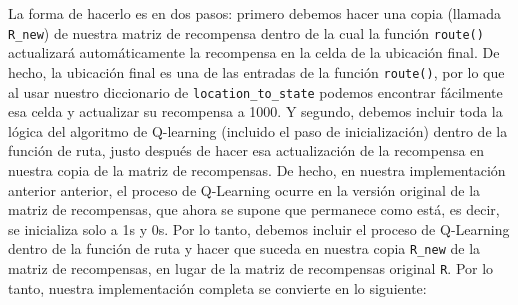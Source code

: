 \documentclass[
]{book}
\begin{document}
La forma de hacerlo es en dos pasos: primero debemos hacer una copia (llamada \texttt{R\_new}) de nuestra matriz de recompensa dentro de la cual la función \texttt{route()} actualizará automáticamente la recompensa en la celda de la ubicación final. De hecho, la ubicación final es una de las entradas de la función \texttt{route()}, por lo que al usar nuestro diccionario de \texttt{location\_to\_state} podemos encontrar fácilmente esa celda y actualizar su recompensa a 1000. Y segundo, debemos incluir toda la lógica del algoritmo de Q-learning (incluido el paso de inicialización) dentro de la función de ruta, justo después de hacer esa actualización de la recompensa en nuestra copia de la matriz de recompensas. De hecho, en nuestra implementación anterior anterior, el proceso de Q-Learning ocurre en la versión original de la matriz de recompensas, que ahora se supone que permanece como está, es decir, se inicializa solo a 1s y 0s. Por lo tanto, debemos incluir el proceso de Q-Learning dentro de la función de ruta y hacer que suceda en nuestra copia \texttt{R\_new} de la matriz de recompensas, en lugar de la matriz de recompensas original \texttt{R}. Por lo tanto, nuestra implementación completa se convierte en lo siguiente:
\end{document}
